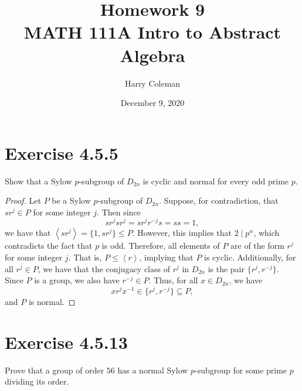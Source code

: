 \documentclass[12pt]{article}
\newenvironment{problem}
    {\begin{lrbox}{\mybox}\begin{minipage}{0.98\textwidth}}
    {\end{minipage}\end{lrbox}\framebox[\textwidth]{\usebox{\mybox}}}
\newcommand{\<}{\left\langle}
\renewcommand{\>}{\right\rangle}
\begin{document}
 
\title{Homework 9\\
    \large MATH 111A Intro to Abstract Algebra
}
\author{Harry Coleman}
\date{December 9, 2020}
\maketitle

\section{Exercise 4.5.5}
\begin{problem}
    Show that a Sylow $p$-subgroup of $D_{2n}$ is cyclic and normal for every odd prime $p$.
\end{problem}

\begin{proof}
    Let $P$ be a Sylow $p$-subgroup of $D_{2n}$. Suppose, for contradiction, that $sr^j \in P$ for some integer $j$. Then since
    \[
        sr^jsr^j = sr^jr^{-j}s = ss = 1,
    \]
    we have that $\<sr^j\> = \{1, sr^j\} \leq P$. However, this implies that $2 \mid p^\alpha$, which contradicts the fact that $p$ is odd. Therefore, all elements of $P$ are of the form $r^j$ for some integer $j$. That is, $P \leq \<r\>$, implying that $P$ is cyclic. Additionally, for all $r^j \in P$, we have that the conjugacy class of $r^j$ in $D_{2n}$ is the pair $\{r^j, r^{-j}\}$. Since $P$ is a group, we also have $r^{-j} \in P$. Thus, for all $x \in D_{2n}$, we have
    \[
        xr^jx^{-1} \in \{r^j, r^{-j}\} \subseteq P,
    \]
     and $P$ is normal.
    
\end{proof}

\newpage
\section{Exercise 4.5.13}
\begin{problem}
    Prove that a group of order $56$ has a normal Sylow $p$-subgroup for some prime $p$ dividing its order.
\end{problem}
\end{document}
